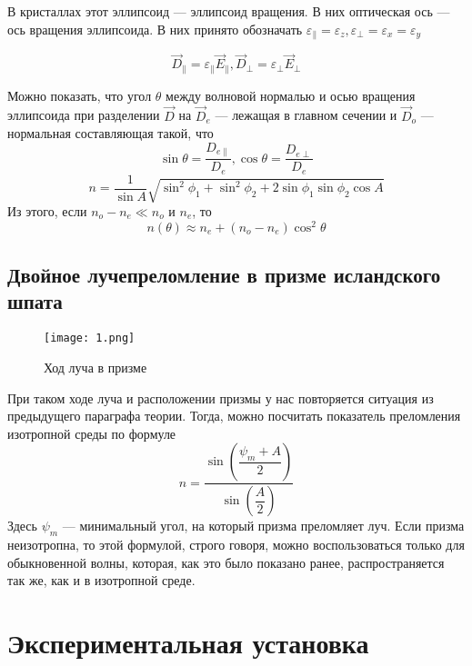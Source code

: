 \documentclass[11pt]{article}
\begin{document}
В кристаллах этот эллипсоид --- эллипсоид вращения. В них оптическая ось --- ось вращения эллипсоида. В них принято обозначать $\varepsilon_{\parallel} = \varepsilon_z, \varepsilon_{\perp} = \varepsilon_x = \varepsilon_y$

\begin{equation}
\vec{D}_{\parallel} = \varepsilon_{\parallel} \vec{E}_{\parallel},\vec{D}_{\perp} = \varepsilon_{\perp} \vec{E}_{\perp} 
\end{equation}

Можно показать, что угол $\theta$ между волновой нормалью и осью вращения эллипсоида при разделении $\vec{D}$ на $\vec{D}_e$ --- лежащая в главном сечении и $\vec{D}_o$ --- нормальная составляющая такой, что
\begin{equation}
\sin \theta = \dfrac{D_{e\parallel}}{D_e}, \cos \theta = \dfrac{D_{e\perp}}{D_e}
\end{equation}
\begin{equation}
n = \dfrac{1}{\sin A}\sqrt{\sin^2 \phi_1 + \sin^2 \phi_2 + 2 \sin \phi_1 \sin \phi_2 \cos A}
\end{equation}
Из этого, если $n_o - n_e \ll n_o$ и $n_e$, то 
\begin{equation}
n(\theta) \approx n_e + (n_o - n_e) \cos^2 \theta
\end{equation}
\subsection*{Двойное лучепреломление в призме исландского шпата}
\begin{wrapfigure}{r}{0.3\textwidth}
  \begin{center}
    \texttt{[image: 1.png]}
  \end{center}
  \caption{Ход луча в призме}
\end{wrapfigure}
При таком ходе луча и расположении призмы у нас повторяется ситуация из предыдущего параграфа теории. Тогда, можно посчитать показатель преломления изотропной среды по формуле 
\begin{equation}
n = \dfrac{\sin\left(\dfrac{\psi_m + A}{2}\right)}{\sin \left(\dfrac{A}{2}\right)}
\end{equation}
Здесь $\psi_m$  --- минимальный угол, на который призма преломляет луч.
Если призма неизотропна, то этой формулой, строго говоря, можно воспользоваться только для обыкновенной волны, которая, как это было показано ранее, распространяется так же, как и в изотропной среде. 
\section*{Экспериментальная установка}
\end{document}

